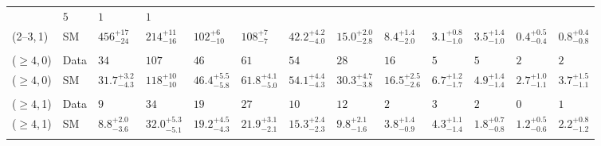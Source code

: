 \begin{table}[h!]
{\begin{tabular}{ lllllllllllll }
               & $5$
               & $1$
               & $1$                                                          \\
               (2--3,\,1)
               & SM         
               & $456^{+17}_{-24}$
               & $214^{+11}_{-16}$
               & $102^{+6}_{-10}$
               & $108^{+7}_{-7}$
               & $42.2^{+4.2}_{-4.0}$
               & $15.0^{+2.0}_{-2.8}$
               & $8.4^{+1.4}_{-2.0}$
               & $3.1^{+0.8}_{-1.0}$
               & $3.5^{+1.4}_{-1.0}$
               & $0.4^{+0.5}_{-0.4}$
               & $0.8^{+0.4}_{-0.8}$                                          \\\\[-2ex]
               ($\geq4$,\,0)
               & Data
               & $34$
               & $107$
               & $46$
               & $61$
               & $54$
               & $28$
               & $16$
               & $5$
               & $5$
               & $2$
               & $2$                                                          \\
               ($\geq4$,\,0)
               & SM
               & $31.7^{+3.2}_{-4.3}$
               & $118^{+10}_{-10}$
               & $46.4^{+5.5}_{-5.8}$
               & $61.8^{+4.1}_{-5.0}$
               & $54.1^{+4.4}_{-4.3}$
               & $30.3^{+4.7}_{-3.8}$
               & $16.5^{+2.5}_{-2.6}$
               & $6.7^{+1.2}_{-1.7}$
               & $4.9^{+1.4}_{-1.4}$
               & $2.7^{+1.0}_{-1.1}$
               & $3.7^{+1.5}_{-1.1}$                                          \\\\[-2ex]
               ($\geq4$,\,1)
               & Data
               & $9$
               & $34$
               & $19$
               & $27$
               & $10$
               & $12$
               & $2$
               & $3$
               & $2$
               & $0$
               & $1$                                                          \\
               ($\geq4$,\,1)
               & SM
               & $8.8^{+2.0}_{-3.6}$
               & $32.0^{+5.3}_{-5.1}$
               & $19.2^{+4.5}_{-4.3}$
               & $21.9^{+3.1}_{-2.1}$
               & $15.3^{+2.4}_{-2.3}$
               & $9.8^{+2.1}_{-1.6}$
               & $3.8^{+1.4}_{-0.9}$
               & $4.3^{+1.1}_{-1.4}$
               & $1.8^{+0.7}_{-0.8}$
               & $1.2^{+0.5}_{-0.6}$
               & $2.2^{+0.8}_{-1.2}$                                          \\\\[-3ex]
      \hline
   \end{tabular}
 }
\end{table}

